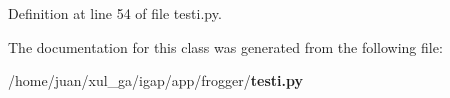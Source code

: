 \subsubsection{}\label{classapp_1_1frogger_1_1testi_1_1MyFrame_e063a1fe7d718867d3a60bc8a70c4318}




Definition at line 54 of file testi.py.

The documentation for this class was generated from the following file:\begin{CompactItemize}
\item 
/home/juan/xul\_\-ga/igap/app/frogger/{\bf testi.py}\end{CompactItemize}

